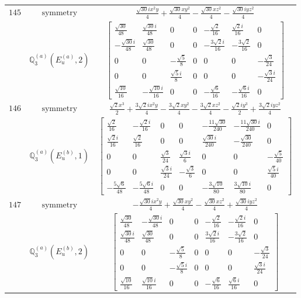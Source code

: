 \documentclass[fleqn,8pt,landscape]{jsarticle}
\begin{document}
\begin{longtable}{ccc}
$ 145 $ & $ \text{symmetry} $ & $ \frac{\sqrt{30} i x^{2} y}{4} + \frac{\sqrt{30} x y^{2}}{4} - \frac{\sqrt{30} x z^{2}}{4} - \frac{\sqrt{30} i y z^{2}}{4} $ \\
$  $ & $ \mathbb{Q}_{3}^{(a)}(E_{u}^{(a)},2) $ & $ \begin{bmatrix} \frac{\sqrt{30}}{48} & \frac{\sqrt{30} i}{48} & 0 & 0 & - \frac{\sqrt{2}}{16} & \frac{\sqrt{2} i}{16} & 0 \\ - \frac{\sqrt{30} i}{48} & \frac{\sqrt{30}}{48} & 0 & 0 & - \frac{3 \sqrt{2} i}{16} & - \frac{3 \sqrt{2}}{16} & 0 \\ 0 & 0 & - \frac{\sqrt{5}}{8} & 0 & 0 & 0 & - \frac{\sqrt{3}}{24} \\ 0 & 0 & \frac{\sqrt{5} i}{8} & 0 & 0 & 0 & - \frac{\sqrt{3} i}{24} \\ \frac{\sqrt{10}}{16} & - \frac{\sqrt{10} i}{16} & 0 & 0 & - \frac{\sqrt{6}}{16} & - \frac{\sqrt{6} i}{16} & 0 \end{bmatrix} $ \\ \hline
$ 146 $ & $ \text{symmetry} $ & $ \frac{\sqrt{2} x^{3}}{2} + \frac{3 \sqrt{2} i x^{2} y}{4} - \frac{3 \sqrt{2} x y^{2}}{4} - \frac{3 \sqrt{2} x z^{2}}{4} - \frac{\sqrt{2} i y^{3}}{2} + \frac{3 \sqrt{2} i y z^{2}}{4} $ \\
$  $ & $ \mathbb{Q}_{3}^{(a)}(E_{u}^{(b)},1) $ & $ \begin{bmatrix} \frac{\sqrt{2}}{16} & - \frac{\sqrt{2} i}{16} & 0 & 0 & - \frac{11 \sqrt{30}}{240} & - \frac{11 \sqrt{30} i}{240} & 0 \\ \frac{\sqrt{2} i}{16} & \frac{\sqrt{2}}{16} & 0 & 0 & \frac{\sqrt{30} i}{240} & - \frac{\sqrt{30}}{240} & 0 \\ 0 & 0 & \frac{\sqrt{3}}{24} & \frac{\sqrt{3} i}{6} & 0 & 0 & - \frac{\sqrt{5}}{40} \\ 0 & 0 & \frac{\sqrt{3} i}{24} & - \frac{\sqrt{3}}{6} & 0 & 0 & \frac{\sqrt{5} i}{40} \\ - \frac{5 \sqrt{6}}{48} & - \frac{5 \sqrt{6} i}{48} & 0 & 0 & - \frac{3 \sqrt{10}}{80} & \frac{3 \sqrt{10} i}{80} & 0 \end{bmatrix} $ \\ \hline
$ 147 $ & $ \text{symmetry} $ & $ - \frac{\sqrt{30} i x^{2} y}{4} + \frac{\sqrt{30} x y^{2}}{4} - \frac{\sqrt{30} x z^{2}}{4} + \frac{\sqrt{30} i y z^{2}}{4} $ \\
$  $ & $ \mathbb{Q}_{3}^{(a)}(E_{u}^{(b)},2) $ & $ \begin{bmatrix} \frac{\sqrt{30}}{48} & - \frac{\sqrt{30} i}{48} & 0 & 0 & - \frac{\sqrt{2}}{16} & - \frac{\sqrt{2} i}{16} & 0 \\ \frac{\sqrt{30} i}{48} & \frac{\sqrt{30}}{48} & 0 & 0 & \frac{3 \sqrt{2} i}{16} & - \frac{3 \sqrt{2}}{16} & 0 \\ 0 & 0 & - \frac{\sqrt{5}}{8} & 0 & 0 & 0 & - \frac{\sqrt{3}}{24} \\ 0 & 0 & - \frac{\sqrt{5} i}{8} & 0 & 0 & 0 & \frac{\sqrt{3} i}{24} \\ \frac{\sqrt{10}}{16} & \frac{\sqrt{10} i}{16} & 0 & 0 & - \frac{\sqrt{6}}{16} & \frac{\sqrt{6} i}{16} & 0 \end{bmatrix} $ \\ \hline

\end{longtable}
\end{document}

